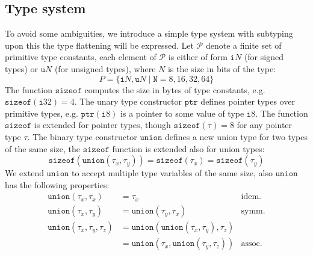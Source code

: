 \documentclass[compsoc,conference,a4paper,10pt,times]{IEEEtran}
\begin{document}

\subsection{Type system}\label{subsec:typeflatteningnotion}
\noindent
To avoid some ambiguities, we introduce a simple type system with subtyping upon this the type 
flattening will be expressed. Let $\mathcal{P}$ denote a finite set of primitive type constants, each element
of $\mathcal{P}$ is either of form $\mathtt{i}N$ (for signed types) or $\mathtt{u}N$ 
(for unsigned types), where $N$ is the size in bits of the type:
\begin{equation*}
  P = \lbrace \mathtt{i}N, \mathtt{u}N \mid \mathtt{N} = 8,16,32,64 \rbrace
\end{equation*}
The function $\mathtt{sizeof}$ computes the size in bytes of type constants, 
e.g. $\mathtt{sizeof}(\mathtt{i}32) = 4$. The unary type constructor $\mathtt{ptr}$ defines pointer types
over primitive types, e.g. $\mathtt{ptr}(\mathtt{i}8)$ is a pointer to some value of type $\mathtt{i}8$.
The function $\mathtt{sizeof}$ is extended for pointer types, though $\mathtt{sizeof(\tau)} = 8$ for
any pointer type $\tau$. The binary type constructor $\mathtt{union}$ defines a new union type for 
two types of the same size, the $\mathtt{sizeof}$ function is extended also for union types:
\begin{equation*}
  \mathtt{sizeof}(\mathtt{union}(\tau_{x}, \tau_{y})) = \mathtt{sizeof}(\tau_{x}) = \mathtt{sizeof}(\tau_{y})
\end{equation*}
We extend $\mathtt{union}$ to accept multiple type variables of the same size, also $\mathtt{union}$ has 
the following properties:
\begin{align*}
  \mathtt{union}(\tau_{x}, \tau_{x}) &= \tau_{x} & \text{idem.} \\
  \mathtt{union}(\tau_{x}, \tau_{y}) &= \mathtt{union}(\tau_{y}, \tau_{x}) & \text{symm.} \\
  \mathtt{union}(\tau_{x}, \tau_{y}, \tau_{z}) &= \mathtt{union}(\mathtt{union}(\tau_{x}, \tau_{y}), \tau_{z}) & \\
  &= \mathtt{union}(\tau_{x}, \mathtt{union}(\tau_{y}, \tau_{z})) & \text{assoc.}
\end{align*}
\end{document}
